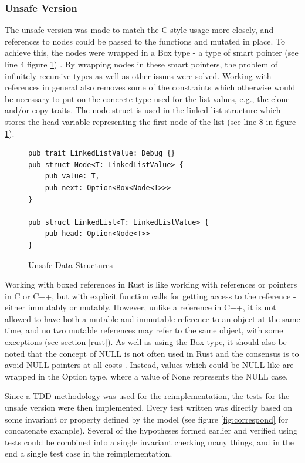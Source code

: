 \subsubsection{Unsafe Version}

The unsafe version was made to match the C-style usage more closely, and references to nodes could be passed to the functions and mutated in place. To achieve this, the nodes were wrapped in a Box type - a type of smart pointer (see line 4 figure \ref{fig:unsafestructs}) \cite{CPPHISTORY}. By wrapping nodes in these smart pointers, the problem of infinitely recursive types as well as other issues were solved. Working with references in general also removes some of the constraints which otherwise would be necessary to put on the concrete type used for the list values, e.g., the clone and/or copy traits. The node struct is used in the linked list structure which stores the head variable representing the first node of the list (see line 8 in figure \ref{fig:unsafestructs}).

\begin{figure}[H]
 \vspace{12pt}
\begin{lstlisting}[style=RUSTSTYLE]
pub trait LinkedListValue: Debug {}
pub struct Node<T: LinkedListValue> {
    pub value: T,
    pub next: Option<Box<Node<T>>>
}

pub struct LinkedList<T: LinkedListValue> {
    pub head: Option<Node<T>>
}
\end{lstlisting} 
    \caption{Unsafe Data Structures}
    \label{fig:unsafestructs}
\end{figure}


Working with boxed references in Rust is like working with references or pointers in C or C++, but with explicit function calls for getting access to the reference - either immutably or mutably. However, unlike a reference in C++, it is not allowed to have both a mutable and immutable reference to an object at the same time, and no two mutable references may refer to the same object, with some exceptions (see section \ref{rust}). As well as using the Box type, it should also be noted that the concept of NULL is not often used in Rust and the consensus is to avoid NULL-pointers at all costs \cite{THERUSTPROGRAMMINGLANGUAGE}. Instead, values which could be NULL-like are wrapped in the Option type, where a value of None represents the NULL case.

Since a TDD methodology was used for the reimplementation, the tests for the unsafe version were then implemented. Every test written was directly based on some invariant or property defined by the model (see figure \ref{fig:correspond} for concatenate example). Several of the hypotheses formed earlier and verified using tests could be combined into a single invariant checking many things, and in the end a single test case in the reimplementation.


